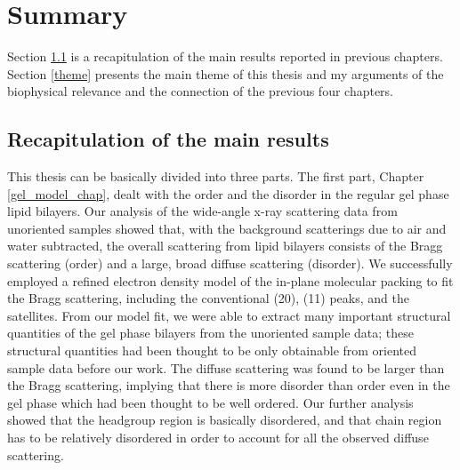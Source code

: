 \chapter{Summary}
\label{summary_chap}

Section \ref{recap} is a recapitulation of the main results
reported in previous chapters. Section \ref{theme} presents
the main theme of this thesis and my arguments of the biophysical
relevance and the connection of the previous four chapters.

\section{Recapitulation of the main results}
\label{recap}

This thesis can be basically divided into three parts. The first part,
Chapter \ref{gel_model_chap}, dealt with the order and the disorder in
the regular gel phase lipid bilayers. Our analysis of the wide-angle 
x-ray scattering data from unoriented samples showed that, with the 
background scatterings due to air and water subtracted, the overall 
scattering from lipid bilayers consists of the Bragg scattering (order) and a 
large, broad diffuse scattering (disorder). We successfully employed a 
refined electron density model of the in-plane molecular packing to fit 
the Bragg scattering, including the conventional (20), (11) peaks, and the 
satellites. From our model fit, we were able to extract many important 
structural quantities of the gel phase bilayers from the unoriented sample 
data; these structural quantities had been thought to be only obtainable 
from oriented sample data before our work. The diffuse scattering was 
found to be larger than the Bragg scattering, implying that there
is more disorder than order even in the gel phase which had been thought
to be well ordered. Our further analysis showed that the headgroup region
is basically disordered, and that chain region has to be relatively 
disordered in order to account for all the observed diffuse scattering.

